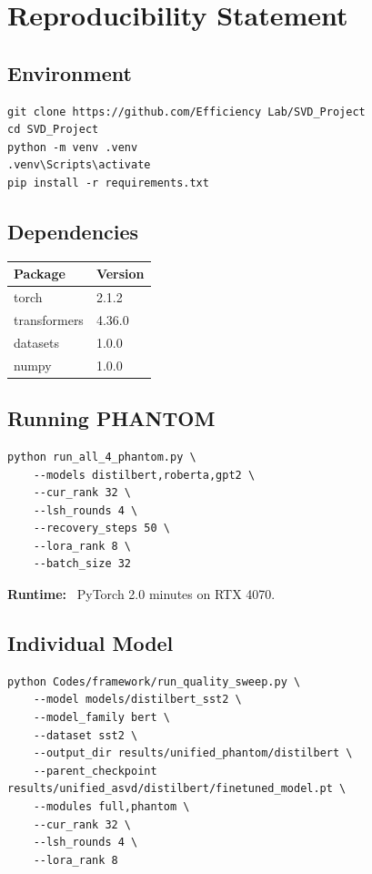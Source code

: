 
\section{Reproducibility Statement}

\subsection{Environment}

\begin{lstlisting}
git clone https://github.com/Efficiency Lab/SVD_Project
cd SVD_Project
python -m venv .venv
.venv\Scripts\activate
pip install -r requirements.txt
\end{lstlisting}

\subsection{Dependencies}

\begin{table}[H]
\centering
\small
\begin{tabular}{ll}
\toprule
\textbf{Package} & \textbf{Version} \\
\midrule
torch & 2.1.2 \\
transformers & 4.36.0 \\
datasets & 1.0.0 \\
numpy & 1.0.0 \\
\bottomrule
\end{tabular}
\end{table}

\subsection{Running PHANTOM}

\begin{lstlisting}
python run_all_4_phantom.py \
    --models distilbert,roberta,gpt2 \
    --cur_rank 32 \
    --lsh_rounds 4 \
    --recovery_steps 50 \
    --lora_rank 8 \
    --batch_size 32
\end{lstlisting}

\textbf{Runtime:} ~PyTorch 2.0 minutes on RTX 4070.

\subsection{Individual Model}

\begin{lstlisting}
python Codes/framework/run_quality_sweep.py \
    --model models/distilbert_sst2 \
    --model_family bert \
    --dataset sst2 \
    --output_dir results/unified_phantom/distilbert \
    --parent_checkpoint results/unified_asvd/distilbert/finetuned_model.pt \
    --modules full,phantom \
    --cur_rank 32 \
    --lsh_rounds 4 \
    --lora_rank 8
\end{lstlisting}

